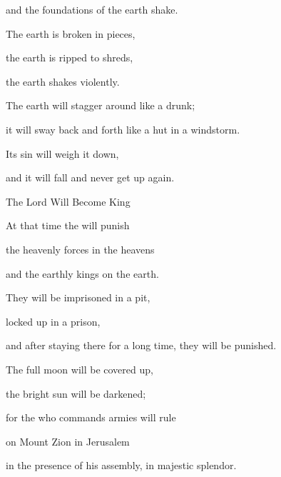 {\par }{\Q and the foundations
of the earth
shake.
\par }{\Q {}The earth
is broken
in pieces,
\par }{\Q the earth
is ripped to shreds,
\par }{\Q the earth
shakes violently.
\par }{\Q {}The earth
will stagger
around
like a drunk;
\par }{\Q it
will sway back and forth like a hut
in a windstorm.

\par }{\Q Its sin
will weigh it down,
\par }{\Q and it will fall
and never
get
up again.
\par }{\SH The Lord Will Become King
\par }{\Q {}At that time
the {}
will punish
\par }{\Q the heavenly forces
in the heavens
\par }{\Q and the earthly
kings
on
the earth.
\par }{\Q {}They will be imprisoned
in a pit,
\par }{\Q locked up
in a prison,
\par }{\Q and after staying there for a long
time,
they will be punished.
\par }{\Q {}The full moon
will be covered up,
\par }{\Q the bright sun
will be darkened;

\par }{\Q for
the {}
who commands armies
will rule
\par }{\Q on Mount
Zion
in Jerusalem
\par }{\Q in the presence
of his assembly, in majestic
splendor.

\par }
